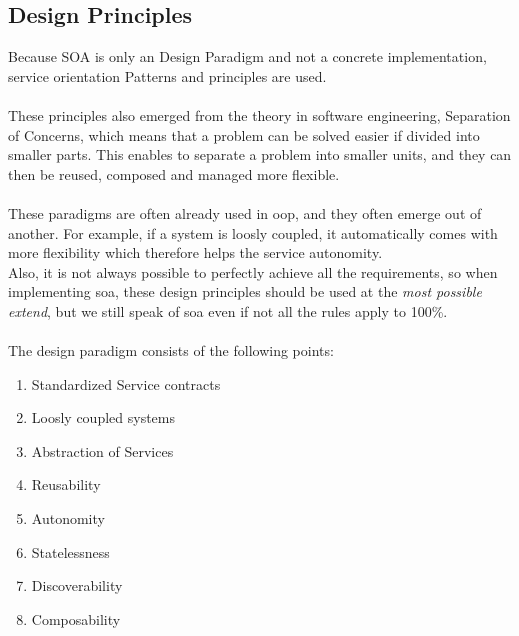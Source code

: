 \documentclass[12pt]{article}
\begin{document}
\subsection{Design Principles}
\label{sec:dp}
Because SOA is only an Design Paradigm and not a concrete implementation, service orientation Patterns and principles are used.\\\\
These principles also emerged from the theory in software engineering, Separation of Concerns, which means that a problem can be solved easier if divided into smaller parts. This enables to separate a problem into smaller units, and they can then be reused, composed and managed more flexible.  \cite[page 86]{te}\\
\\
These paradigms are often already used in \gls{oop}, and they often emerge out of another. For example, if a system is loosly coupled, it automatically comes with more flexibility which therefore helps the service autonomity. \\
Also, it is not always possible to perfectly achieve all the requirements, so when implementing \gls{soa}, these design principles should be used at the \textit{most possible extend}, but we still speak of \gls{soa} even if not all the rules apply to 100\%. \\ \\
The design paradigm consists of the following points:
\begin{enumerate}
\item Standardized Service contracts
\item Loosly coupled systems
\item Abstraction of Services
\item Reusability
\item Autonomity
\item Statelessness
\item Discoverability
\item Composability
\end{enumerate}\cite[page 25]{grau}
\end{document}
